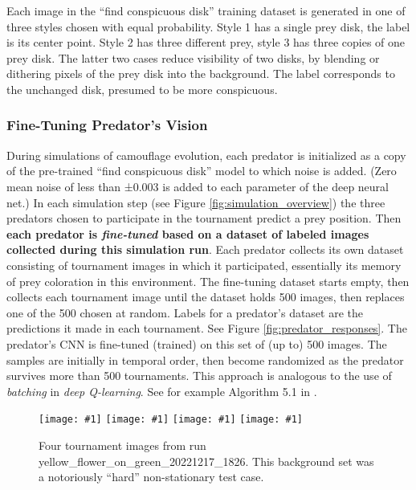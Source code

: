 \documentclass[letterpaper]{article}
\newcommand{\jargon}[1]{\textit{#1}}
\newcommand{\runID}{\footnotesize}
\newcommand{\igfour}[1]{\texttt{[image: \#1]}}
\begin{document}
Each image in the “find conspicuous disk” training dataset is generated in one of three styles chosen with equal probability. Style 1 has a single prey disk, the label is its center point. Style 2 has three different prey, style 3 has three copies of one prey disk. The latter two cases reduce visibility of two disks, by blending or dithering pixels of the prey disk into the background. The label corresponds to the unchanged disk, presumed to be more conspicuous.
\par

\subsubsection{Fine-Tuning Predator's Vision}
During simulations of camouflage evolution, each predator is initialized as a copy of the pre-trained “find conspicuous disk” model to which noise is added. (Zero mean noise of less than ±0.003 is added to each parameter of the deep neural net.) In each simulation step (see Figure \ref{fig:simulation_overview}) the three predators chosen to participate in the tournament predict a prey position. Then \textbf{each predator is \jargon{fine-tuned} based on a dataset of labeled images collected during this simulation run}. 
Each predator collects its own dataset consisting of tournament images in which it participated, essentially its memory of prey coloration in this environment. The fine-tuning dataset starts empty, then collects each tournament image until the dataset holds 500 images, then replaces one of the 500 chosen at random. Labels for a predator's dataset are the predictions it made in each tournament. See Figure \ref{fig:predator_responses}. The predator's CNN is fine-tuned (trained) on this set of (up to) 500 images. The samples are initially in temporal order, then become randomized as the predator survives more than 500 tournaments. This approach is analogous to the use of \jargon{batching} in \jargon{deep Q-learning}. See for example Algorithm 5.1 in \citet{casgrain_deep_2022}.
\par


\begin{figure}[t]
    \igfour{20221218_step_5396.png}
    \hfill
    \igfour{20221218_step_5641.png}
    \hfill
    \igfour{20221218_step_5947.png}
    \hfill
    \igfour{20221218_step_6753.png}
    \caption{Four tournament images from run {\runID yellow\_flower\_on\_green\_20221217\_1826}. This background set was a notoriously “hard” non-stationary test case.}
    \label{fig:yellow_flower_4x}
\end{figure}
\end{document}
